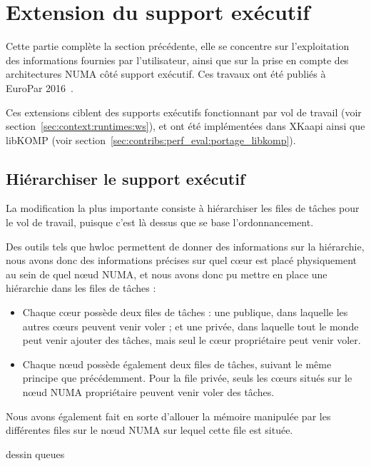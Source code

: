 \section{Extension du support exécutif}\label{sec:openmp:runtime}

Cette partie complète la section précédente, elle se concentre sur l'exploitation des informations fournies par l'utilisateur, ainsi que sur la prise en compte des architectures NUMA côté support exécutif.
Ces travaux ont été publiés à EuroPar 2016~\cite{Virouleau2016b}.

Ces extensions ciblent des supports exécutifs fonctionnant par vol de travail (voir section~\ref{sec:context:runtimes:ws}), et ont été implémentées dans XKaapi ainsi que libKOMP (voir section~\ref{sec:contribs:perf_eval:portage_libkomp}).

\subsection{Hiérarchiser le support exécutif}

La modification la plus importante consiste à hiérarchiser les files de tâches pour le vol de travail, puisque c'est là dessus que se base l'ordonnancement.

Des outils tels que hwloc permettent de donner des informations sur la hiérarchie, nous avons donc des informations précises sur quel cœur est placé physiquement au sein de quel nœud NUMA, et nous avons donc pu mettre en place une hiérarchie dans les files de tâches :

\begin{itemize}
  \item Chaque cœur possède deux files de tâches : une publique, dans laquelle les autres cœurs peuvent venir voler ; et une privée, dans laquelle tout le monde peut venir ajouter des tâches, mais seul le cœur propriétaire peut venir voler.
  \item Chaque nœud possède également deux files de tâches, suivant le même principe que précédemment. Pour la file privée, seuls les cœurs situés sur le nœud NUMA propriétaire peuvent venir voler des tâches.
\end{itemize}

Nous avons également fait en sorte d'allouer la mémoire manipulée par les différentes files sur le nœud NUMA sur lequel cette file est située.

\begin{todo}
  dessin queues
\end{todo}


